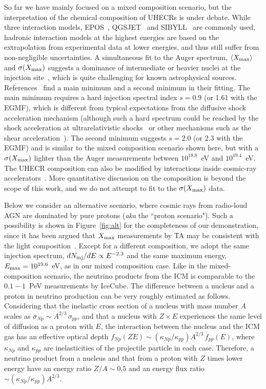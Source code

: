 \documentclass[aps,prd,onecolumn,superscriptaddress,11pt]{revtex4}
\begin{document}
So far we have mainly focused on a mixed composition scenario, but the interpretation of the chemical composition of UHECRs is under debate. While three interaction models, EPOS~\cite{2013JCAP...02..026P}, QGSJET~\cite{Ostapchenko:2006wc} and SIBYLL~\cite{Ahn:2009wx} are commonly used, hadronic interaction models at the highest energies are based on the extrapolation from experimental data at lower energies, and thus still suffer from non-negligible uncertainties. 
A simultaneous fit to the Auger spectrum, $\langle X_{\rm max}\rangle$ and $\sigma(X_{\rm max})$ suggests a dominance of intermediate or heavier nuclei at the injection site~\cite{Taylor:2011ta,2016arXiv161207155T}, which is quite challenging for known astrophysical sources. References~\cite{2016arXiv161207155T, Wittkowski:2017okb} find a main minimum and a second minimum in their fitting. The main minimum requires a hard injection spectral index $s=0.9$ (or 1.61 with the EGMF), which is different from typical expectations from the diffusive shock acceleration mechanism (although such a hard spectrum could be reached by the shock acceleration at ultrarelativistic shocks~\cite{2008A&A...492..323M,Aoi:2007aj} or other mechanisms such as the shear acceleration~\cite{Kimura:2017ubz}). The second minimum suggests $s=2.0$ (or 2.3 with the EGMF) and is similar to the mixed composition scenario shown here, but with a $\sigma(X_{\rm max})$ lighter than the Auger measurements between $10^{18.8}$~eV and $10^{19.4}$~eV. The UHECR composition can also be modified by interactions inside cosmic-ray accelerators~\cite{2012ApJ...749...63M, 2012ApJ...750..118F, 2014PhRvD..90b3007M}. More quantitative discussion on the composition is beyond the scope of this work, and we do not attempt to fit to the $\sigma (X_{\rm max})$ data. 

Below we consider an alternative scenario, where cosmic rays from radio-loud AGN are dominated by pure protons ({\it aka} the ``proton scenario"). Such a possibility is shown in Figure~\ref{fig:alt} for the completeness of our demonstration, since it has been argued that $X_{\rm max}$ measurements by TA may be consistent with the light composition~\cite{TA_ICRC15}. Except for a different composition, we adopt the same injection spectrum, $dN_{\rm inj}/dE\propto E^{-2.3}$ and the same maximum energy, $E_{\rm max}=10^{19.6}$~eV, as in our mixed composition case. 
Like in the mixed-composition scenario, the neutrino products from the ICM is comparable to the $0.1-1$~PeV measurements by IceCube. The difference between a nucleus and a proton in neutrino production can be very roughly estimated as follows. Considering that the inelastic cross section of a nucleus with mass number $A$ scales as $\sigma_{Np}\sim A^{2/3}\,\sigma_{pp}$, and that a nucleus with $Z\times E$ experiences the same level of diffusion as a proton with $E$, the interaction between the nucleus and the ICM gas has an effective optical depth $f_{Np}(ZE)\sim(\kappa_{Np}/\kappa_{pp})A^{2/3}\,f_{pp}(E)$, where $\kappa_{Np}$ and $\kappa_{pp}$ are inelasticities of the projectile particle in each case. Therefore, a neutrino product from a nucleus and that from a proton with $Z$ times lower energy have an energy ratio $Z/A\sim0.5$ and an energy flux ratio $\sim(\kappa_{Np}/\kappa_{pp})A^{2/3}$.  
\end{document}

